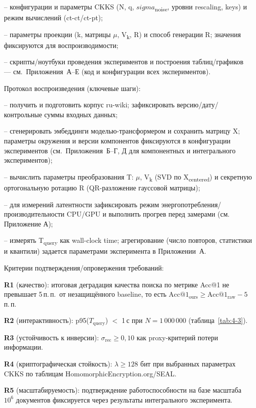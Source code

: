 \documentclass[a4paper, 12pt, oneside, openany]{article}
\begin{document}
-- конфигурации и параметры CKKS (N, q, $sigma$\textsubscript{noise}, уровни rescaling, keys) и режим вычислений (ct-ct/ct-pt);

-- параметры проекции (k, матрицы $\mu$, V\textsubscript{k}, R) и способ генерации R; значения фиксируются для воспроизводимости;

-- скрипты/ноутбуки проведения экспериментов и построения таблиц/графиков --- см.\ Приложения~А--Е (код и конфигурации всех экспериментов).

Протокол воспроизведения (ключевые шаги):

-- получить и подготовить корпус ru-wiki; зафиксировать версию/дату/контрольные суммы входных данных;

-- сгенерировать эмбеддинги моделью-трансформером и сохранить матрицу X; параметры окружения и версии компонентов фиксируются в конфигурации экспериментов (см.\ Приложения~Б--Г, Д для компонентных и интегрального экспериментов);

-- вычислить параметры преобразования T: $\mu$, V\textsubscript{k} (SVD по X\textsubscript{centered}) и секретную ортогональную ротацию R (QR-разложение гауссовой матрицы);

-- для измерений латентности зафиксировать режим энергопотребления/производительности CPU/GPU и выполнить прогрев перед замерами (см. Приложение А);

-- измерять T\textsubscript{query} как wall-clock time; агрегирование (число повторов, статистики и квантили) задается параметрами эксперимента в Приложении~А.

Критерии подтверждения/опровержения требований:

\textbf{R1} (качество): итоговая деградация качества поиска по метрике Acc@1 не превышает 5\,п.\,п.\ от незащищённого baseline, то есть $\mathrm{Acc@1}_{\mathrm{ours}} \geq \mathrm{Acc@1}_{\mathrm{raw}} - 5$\,п.\,п.

 \textbf{R2} (интерактивность): p95($T_{\mathrm{query}}$) $<$ 1\,с при $N = 1\,000\,000$ (таблица~\ref{tab:4-3}).

\textbf{R3} (устойчивость к инверсии): $\sigma_{\mathrm{rec}} \geq 0{,}10$ как proxy-критерий потери информации.

\textbf{R4} (крип\-то\-гра\-фи\-чес\-кая стой\-кость): $\lambda \geq 128$ бит при выбранных параметрах CKKS по таблицам HomomorphicEncryption.org/SEAL.

\textbf{R5} (масштабируемость): подтверждение работоспособности на базе масштаба $10^6$ документов фиксируется через результаты интегрального эксперимента.
\end{document}
